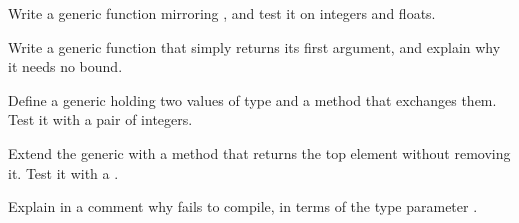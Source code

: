 \exercise Write a generic function  mirroring ,
and test it on integers and floats.

\exercise Write a generic function  that simply
returns its first argument, and explain why it needs no bound.

\exercise Define a generic  holding two values of type
 and a method  that exchanges them. Test it with a pair of
integers.

\exercise Extend the generic  with a  method that returns
the top element without removing it. Test it with a .

\exercise Explain in a comment why  fails to compile, in terms
of the type parameter .
